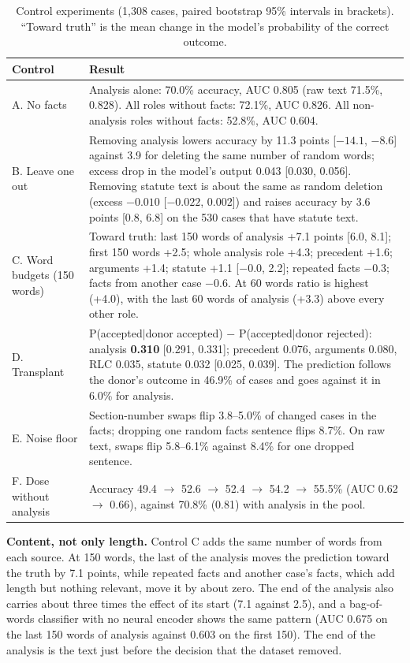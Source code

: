 \documentclass[conference]{IEEEtran}
\begin{document}
\begin{table}[t]
\caption{Control experiments (1,308 cases, paired bootstrap 95\% intervals in brackets). ``Toward truth'' is the mean change in the model's probability of the correct outcome.}
\label{tab:controls}
\centering
\small
\begin{tabularx}{\textwidth}{lX}
\toprule
\textbf{Control} & \textbf{Result} \\
\midrule
A. No facts & Analysis alone: 70.0\% accuracy, AUC 0.805 (raw text 71.5\%, 0.828). All roles without facts: 72.1\%, AUC 0.826. All non-analysis roles without facts: 52.8\%, AUC 0.604. \\
B. Leave one out & Removing analysis lowers accuracy by 11.3 points [$-14.1$, $-8.6$] against 3.9 for deleting the same number of random words; excess drop in the model's output 0.043 [0.030, 0.056]. Removing statute text is about the same as random deletion (excess $-0.010$ [$-0.022$, 0.002]) and raises accuracy by 3.6 points [0.8, 6.8] on the 530 cases that have statute text. \\
C. Word budgets (150 words) & Toward truth: last 150 words of analysis +7.1 points [6.0, 8.1]; first 150 words +2.5; whole analysis role +4.3; precedent +1.6; arguments +1.4; statute +1.1 [$-0.0$, 2.2]; repeated facts $-0.3$; facts from another case $-0.6$. At 60 words ratio is highest (+4.0), with the last 60 words of analysis (+3.3) above every other role. \\
D. Transplant & P(accepted$\mid$donor accepted) $-$ P(accepted$\mid$donor rejected): analysis \textbf{0.310} [0.291, 0.331]; precedent 0.076, arguments 0.080, RLC 0.035, statute 0.032 [0.025, 0.039]. The prediction follows the donor's outcome in 46.9\% of cases and goes against it in 6.0\% for analysis. \\
E. Noise floor & Section-number swaps flip 3.8--5.0\% of changed cases in the facts; dropping one random facts sentence flips 8.7\%. On raw text, swaps flip 5.8--6.1\% against 8.4\% for one dropped sentence. \\
F. Dose without analysis & Accuracy 49.4 $\rightarrow$ 52.6 $\rightarrow$ 52.4 $\rightarrow$ 54.2 $\rightarrow$ 55.5\% (AUC 0.62 $\rightarrow$ 0.66), against 70.8\% (0.81) with analysis in the pool. \\
\bottomrule
\end{tabularx}
\end{table}

\textbf{Content, not only length.} Control C adds the same number of words from each source. At 150 words, the last of the analysis moves the prediction toward the truth by 7.1 points, while repeated facts and another case's facts, which add length but nothing relevant, move it by about zero. The end of the analysis also carries about three times the effect of its start (7.1 against 2.5), and a bag-of-words classifier with no neural encoder shows the same pattern (AUC 0.675 on the last 150 words of analysis against 0.603 on the first 150). The end of the analysis is the text just before the decision that the dataset removed.
\end{document}
